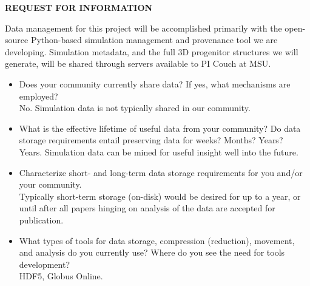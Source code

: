 \documentclass[12pt,letterpaper,english]{article}
\begin{document}
\setlength{\parindent}{0in} %


\pagestyle{fancy} \lhead{\doctitle}  \renewcommand{%
\headrulewidth}{0.0pt}

\begin{center}
\bf \large {REQUEST FOR INFORMATION} \\
\end{center}

\vspace{-.25in}

Data management for this project will be accomplished primarily with the open-source Python-based simulation management and provenance tool we are developing.
Simulation metadata, and the full 3D progenitor structures we will generate, will be shared through servers available to PI Couch at MSU.

\vspace{-.15in}
\begin{itemize}

\item Does your community currently share data? If yes, what
  mechanisms are employed? \\
No.  Simulation data is not typically shared in our community.\\
\item What is the effective lifetime of useful data from your
  community? Do data storage requirements entail preserving data for
  weeks? Months? Years? \\
Years.  Simulation data can be mined for useful insight well into the future.\\
\item Characterize short- and long-term data storage requirements for
  you and/or your community.\\
Typically short-term storage (on-disk) would be desired for up to a
year, or until after all papers hinging on analysis of the data are
accepted for publication.  \\
\item What types of tools for data storage, compression (reduction),
  movement, and analysis do you currently use? Where do you see the
  need for tools development?\\
HDF5, Globus Online.
\end{itemize}
\vspace{-.15in}
\end{document}
